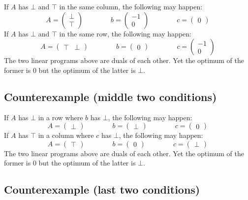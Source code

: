 \documentclass[]{article}
\renewcommand{\.}{\hskip .75pt}
\begin{document}
If $A$ has $\bot$ and $\top$ in the same column, the following may happen:
$$
A = \begin{pmatrix} \bot \\ \top \end{pmatrix}
\qquad \qquad
b = \begin{pmatrix} -1 \\ 0 \end{pmatrix}
\qquad \qquad
c = \begin{pmatrix} 0 \end{pmatrix}
$$
If $A$ has $\bot$ and $\top$ in the same row, the following may happen:
$$
A = \begin{pmatrix} \top & \bot \end{pmatrix}
\qquad \qquad
b = \begin{pmatrix} 0 \end{pmatrix}
\qquad \qquad
c = \begin{pmatrix} -1 \\ 0 \end{pmatrix}
$$
The two linear programs above are duals of each other.
Yet the optimum of the former is $0$
but the optimum of the latter is $\bot$.

\subsection{Counterexample (middle two conditions)}

If $A$ has $\bot$ in a row where $b$ has $\bot$, the following may happen:
$$
A = \begin{pmatrix} \bot \end{pmatrix}
\qquad \qquad
b = \begin{pmatrix} \bot \end{pmatrix}
\qquad \qquad
c = \begin{pmatrix} 0 \end{pmatrix}
$$
If $A$ has $\top$ in a column where $c$ has $\bot$, the following may happen:
$$
A = \begin{pmatrix} \top \end{pmatrix}
\qquad \qquad
b = \begin{pmatrix} 0 \end{pmatrix}
\qquad \qquad
c = \begin{pmatrix} \bot \end{pmatrix}
$$
The two linear programs above are duals of each other.
Yet the optimum of the former is $0$
but the optimum of the latter is $\bot$.

\subsection{Counterexample (last two conditions)}
\end{document}
